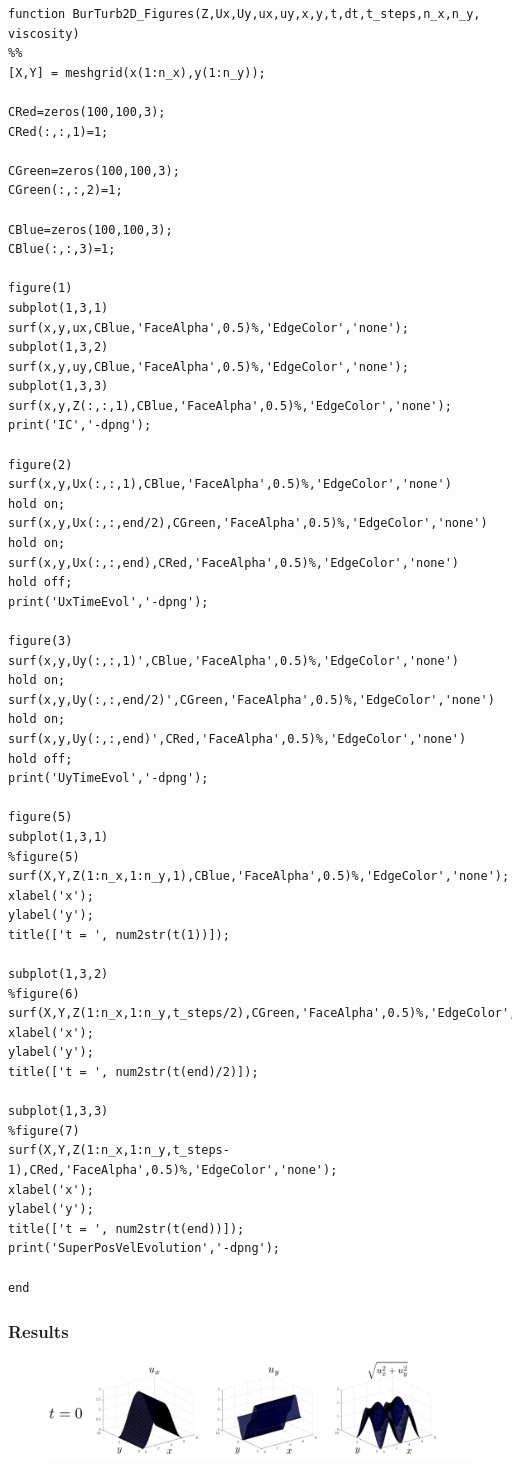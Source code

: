 \documentclass[12pt,twoside]{article}
\begin{document}
\begin{lstlisting}
function BurTurb2D_Figures(Z,Ux,Uy,ux,uy,x,y,t,dt,t_steps,n_x,n_y, viscosity)
%%
[X,Y] = meshgrid(x(1:n_x),y(1:n_y));

CRed=zeros(100,100,3);
CRed(:,:,1)=1;

CGreen=zeros(100,100,3);
CGreen(:,:,2)=1;

CBlue=zeros(100,100,3);
CBlue(:,:,3)=1;

figure(1)
subplot(1,3,1)
surf(x,y,ux,CBlue,'FaceAlpha',0.5)%,'EdgeColor','none');
subplot(1,3,2)
surf(x,y,uy,CBlue,'FaceAlpha',0.5)%,'EdgeColor','none');
subplot(1,3,3)
surf(x,y,Z(:,:,1),CBlue,'FaceAlpha',0.5)%,'EdgeColor','none');
print('IC','-dpng');

figure(2)
surf(x,y,Ux(:,:,1),CBlue,'FaceAlpha',0.5)%,'EdgeColor','none')
hold on;
surf(x,y,Ux(:,:,end/2),CGreen,'FaceAlpha',0.5)%,'EdgeColor','none')
hold on;
surf(x,y,Ux(:,:,end),CRed,'FaceAlpha',0.5)%,'EdgeColor','none')
hold off;
print('UxTimeEvol','-dpng');

figure(3)
surf(x,y,Uy(:,:,1)',CBlue,'FaceAlpha',0.5)%,'EdgeColor','none')
hold on;
surf(x,y,Uy(:,:,end/2)',CGreen,'FaceAlpha',0.5)%,'EdgeColor','none')
hold on;
surf(x,y,Uy(:,:,end)',CRed,'FaceAlpha',0.5)%,'EdgeColor','none')
hold off;
print('UyTimeEvol','-dpng');

figure(5)
subplot(1,3,1)
%figure(5)
surf(X,Y,Z(1:n_x,1:n_y,1),CBlue,'FaceAlpha',0.5)%,'EdgeColor','none');
xlabel('x');
ylabel('y');
title(['t = ', num2str(t(1))]);

subplot(1,3,2)
%figure(6)
surf(X,Y,Z(1:n_x,1:n_y,t_steps/2),CGreen,'FaceAlpha',0.5)%,'EdgeColor','none');
xlabel('x');
ylabel('y');
title(['t = ', num2str(t(end)/2)]);

subplot(1,3,3)
%figure(7)
surf(X,Y,Z(1:n_x,1:n_y,t_steps-1),CRed,'FaceAlpha',0.5)%,'EdgeColor','none');
xlabel('x');
ylabel('y');
title(['t = ', num2str(t(end))]);
print('SuperPosVelEvolution','-dpng');

end
\end{lstlisting}

\newpage

\subsubsection{Results} \label{sec:results}

\begin{figure}[h]
\includegraphics[width=\textwidth]{IC.png}
\end{figure}
\end{document}
